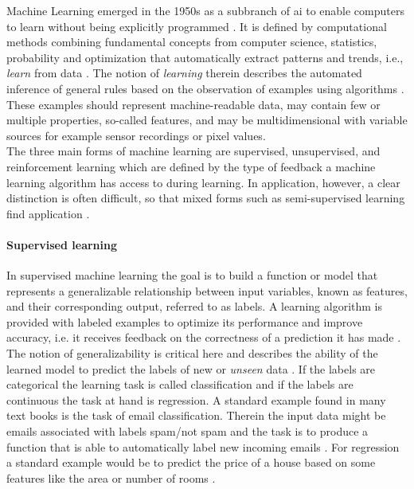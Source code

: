 Machine Learning emerged in the 1950s as a subbranch of \gls{ai} to enable computers to learn without being explicitly programmed \cite{Samual1959}. It is defined by computational methods combining fundamental concepts from computer science, statistics, probability and optimization that automatically extract patterns and trends, i.e., \textit{learn} from data \cite{Hastie2009}. The notion of \textit{learning} therein describes the automated inference of general rules based on the observation of examples using algorithms \cite{Von_luxburg2011}. These examples should represent machine-readable data, may contain few or multiple properties, so-called features, and may be multidimensional with variable sources for example sensor recordings or pixel values.\\
The three main forms of machine learning are supervised, unsupervised, and reinforcement learning which are defined by the type of feedback a machine learning algorithm has access to during learning. In application, however, a clear distinction is often difficult, so that mixed forms such as semi-supervised learning find application \cite{Russell2015}.

\paragraph{Supervised learning}
In supervised machine learning the goal is to build a function or model that represents a generalizable relationship between input variables, known as features, and their corresponding output, referred to as labels. A learning algorithm is provided with labeled examples to optimize its performance and improve accuracy, i.e. it receives feedback on the correctness of a prediction it has made \cite{Russell2015}. The notion of generalizability is critical here and describes the ability of the learned model to predict the labels of new or \textit{unseen} data \cite{Daumé2017}. If the labels are categorical the learning task is called classification and if the labels are continuous the task at hand is regression. A standard example found in many text books is the task of email classification. Therein the input data might be emails associated with labels spam/not spam and the task is to produce a function that is able to automatically label new incoming emails \cite{Shalev2014}. For regression a standard example would be to predict the price of a house based on some features like the area or number of rooms \cite{Ng2022cs229notes}.

